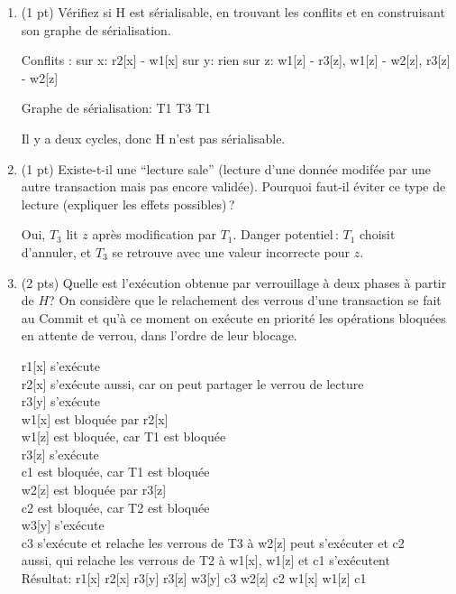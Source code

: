 \begin{enumerate}
   \item (1 pt) V\'erifiez si H est s\'erialisable, en trouvant les conflits et en
    construisant son graphe de s\'erialisation.

\begin{correction}
 Conflits :
      sur x: r2[x] - w1[x]
      sur y: rien
      sur z: w1[z] - r3[z], w1[z] - w2[z], r3[z] - w2[z]

      Graphe de s\'erialisation: T1  T3   T1

 Il y a deux cycles, donc H n'est pas s\'erialisable.
\end{correction}     

   \item (1 pt) Existe-t-il une ``lecture sale'' (lecture d'une donn\'ee modif\'ee
   par une autre transaction mais pas encore valid\'ee). Pourquoi faut-il \'eviter
   ce type de lecture (expliquer les effets possibles)\,?

\begin{correction}
Oui, $T_3$ lit $z$ apr\`es modification par $T_1$. Danger potentiel\,: $T_1$
choisit d'annuler, et $T_3$ se retrouve avec une valeur incorrecte pour $z$.
\end{correction}

     \item (2 pts) Quelle est l'ex\'ecution obtenue par verrouillage \`a deux phases
   \`a partir de $H$? On consid\`ere que le relachement des verrous d'une
   transaction se fait au Commit et qu'\`a ce moment on ex\'ecute en priorit\'e les op\'erations bloqu\'ees
      en attente de verrou, dans l'ordre de leur blocage.
\begin{correction}
       r1[x] s'ex\'ecute\\
      r2[x] s'ex\'ecute aussi, car on peut partager le verrou de lecture\\
      r3[y] s'ex\'ecute\\
      w1[x] est bloqu\'ee par r2[x]\\
      w1[z] est bloqu\'ee, car T1 est bloqu\'ee\\
      r3[z] s'ex\'ecute\\
      c1 est bloqu\'ee, car T1 est bloqu\'ee\\
      w2[z] est bloqu\'ee par r3[z]\\
      c2 est bloqu\'ee, car T2 est bloqu\'ee\\
      w3[y] s'ex\'ecute\\
      c3 s'ex\'ecute et relache les verrous de T3 \`a w2[z] peut s'ex\'ecuter et c2\\
      aussi, qui relache les verrous de T2 \`a w1[x], w1[z] et c1 s'ex\'ecutent\\

      R\'esultat: r1[x] r2[x] r3[y] r3[z] w3[y] c3 w2[z] c2 w1[x] w1[z] c1
\end{correction}
\end{enumerate}
